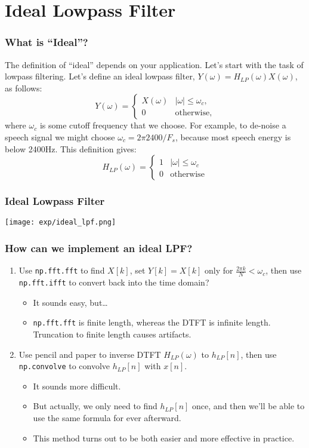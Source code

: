 \documentclass{beamer}
\begin{document}
\section[Ideal LPF]{Ideal Lowpass Filter}
\setcounter{subsection}{1}

\begin{frame}
  \frametitle{What is ``Ideal''?}
  
  The definition of ``ideal'' depends on your application.  Let's
  start with the task of lowpass filtering.  Let's define an ideal
  lowpass filter, $Y(\omega)=H_{LP}(\omega)X(\omega)$, as follows:
  \[
  Y(\omega) = \begin{cases}X(\omega)& |\omega|\le\omega_c,\\
    0 & \mbox{otherwise},
  \end{cases}
  \]
  where $\omega_c$ is some cutoff frequency that we choose.  For
  example, to de-noise a speech signal we might choose $\omega_c=2\pi
  2400/F_s$, because most speech energy is below 2400Hz.  This
  definition gives:
  \[
  H_{LP}(\omega)
  = \begin{cases} 1& |\omega|\le\omega_c\\
    0 & \mbox{otherwise}
  \end{cases}
  \]
\end{frame}

\begin{frame}
  \frametitle{Ideal Lowpass Filter}
  \centerline{\texttt{[image: exp/ideal\_lpf.png]}}
\end{frame}

\begin{frame}
  \frametitle{How can we implement an ideal LPF?}

  \begin{enumerate}
  \item Use {\tt np.fft.fft} to find $X[k]$, set $Y[k]=X[k]$ only for
    $\frac{2\pi k}{N}<\omega_c$, then use {\tt np.fft.ifft}
    to convert back into the time domain?
    \begin{itemize}
    \item It sounds easy, but\ldots
    \item {\tt np.fft.fft} is finite length, whereas the DTFT is
      infinite length.  Truncation to finite length causes artifacts.
    \end{itemize}
  \item Use pencil and paper to inverse DTFT $H_{LP}(\omega)$ to $h_{LP}[n]$,
    then use {\tt np.convolve} to convolve $h_{LP}[n]$ with $x[n]$.
    \begin{itemize}
    \item It sounds more difficult.
    \item But actually, we only need to find $h_{LP}[n]$ once, and
      then we'll be able to use the same formula for ever afterward.
    \item This method turns out to be both easier and more effective
      in practice.
    \end{itemize}
  \end{enumerate}
\end{frame}
\end{document}
